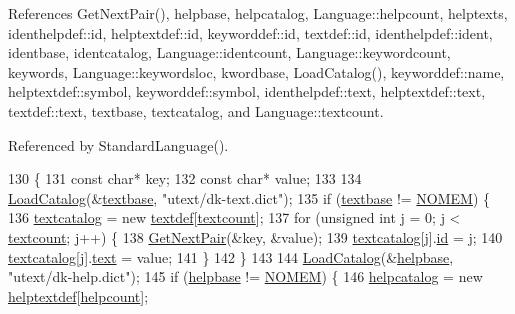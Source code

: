 References Get\+Next\+Pair(), helpbase, helpcatalog, Language\+::helpcount, helptexts, identhelpdef\+::id, helptextdef\+::id, keyworddef\+::id, textdef\+::id, identhelpdef\+::ident, identbase, identcatalog, Language\+::identcount, Language\+::keywordcount, keywords, Language\+::keywordsloc, kwordbase, Load\+Catalog(), keyworddef\+::name, helptextdef\+::symbol, keyworddef\+::symbol, identhelpdef\+::text, helptextdef\+::text, textdef\+::text, textbase, textcatalog, and Language\+::textcount.



Referenced by Standard\+Language().


\begin{DoxyCode}
130 \{
131     \textcolor{keyword}{const} \textcolor{keywordtype}{char}* key;
132     \textcolor{keyword}{const} \textcolor{keywordtype}{char}* value;
133 
134     \hyperlink{classStandardLanguage_a4fe22e49f3ce358690242d0b1058ccfa}{LoadCatalog}(&\hyperlink{classStandardLanguage_a6b73c841d7401e608576087468ccc088}{textbase}, \textcolor{stringliteral}{"utext/dk-text.dict"});
135     \textcolor{keywordflow}{if} (\hyperlink{classStandardLanguage_a6b73c841d7401e608576087468ccc088}{textbase} != \hyperlink{platform_8h_a46ff2bfbf0d44b8466a2251d5bd5e6f8}{NOMEM}) \{
136         \hyperlink{classStandardLanguage_a2b32cc8ca90d4e3da23b83647ce83031}{textcatalog} = \textcolor{keyword}{new} \hyperlink{structtextdef}{textdef}[\hyperlink{classLanguage_ac648059e4bb481a66c5a075ab8684cb8}{textcount}];
137         \textcolor{keywordflow}{for} (\textcolor{keywordtype}{unsigned} \textcolor{keywordtype}{int} j = 0; j < \hyperlink{classLanguage_ac648059e4bb481a66c5a075ab8684cb8}{textcount}; j++) \{
138             \hyperlink{classStandardLanguage_ab1945e2e3503ce12eac28c0d08234cfb}{GetNextPair}(&key, &value);
139             \hyperlink{classStandardLanguage_a2b32cc8ca90d4e3da23b83647ce83031}{textcatalog}[j].\hyperlink{structtextdef_a2e28e2dfda198136301df4c8cab970a6}{id} = j;
140             \hyperlink{classStandardLanguage_a2b32cc8ca90d4e3da23b83647ce83031}{textcatalog}[j].\hyperlink{structtextdef_a24f4d3af836a1f3c840833df7e388b60}{text} = value;
141         \}
142     \}
143 
144     \hyperlink{classStandardLanguage_a4fe22e49f3ce358690242d0b1058ccfa}{LoadCatalog}(&\hyperlink{classStandardLanguage_a59e4ecff11a3a1f03aeff6af81004c2a}{helpbase}, \textcolor{stringliteral}{"utext/dk-help.dict"});
145     \textcolor{keywordflow}{if} (\hyperlink{classStandardLanguage_a59e4ecff11a3a1f03aeff6af81004c2a}{helpbase} != \hyperlink{platform_8h_a46ff2bfbf0d44b8466a2251d5bd5e6f8}{NOMEM}) \{
146         \hyperlink{classStandardLanguage_a75febfaeb78c26265b46b77d6fc5869c}{helpcatalog} = \textcolor{keyword}{new} \hyperlink{structhelptextdef}{helptextdef}[\hyperlink{classLanguage_a9eb566a53c9e64a9abd406a77e97d2f0}{helpcount}];

\end{DoxyCode}
